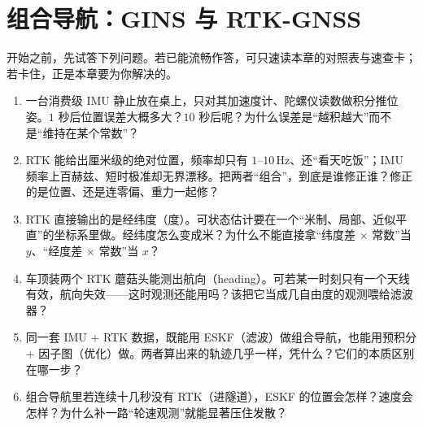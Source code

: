 \chapter{组合导航：GINS 与 RTK-GNSS}
\label{ch:gins}

\begin{practice}[前置自测]
开始之前，先试答下列问题。若已能流畅作答，可只速读本章的对照表与速查卡；若卡住，正是本章要为你解决的。
\begin{enumerate}
  \item 一台消费级 IMU 静止放在桌上，只对其加速度计、陀螺仪读数做积分推位姿。$1$ 秒后位置误差大概多大？$10$ 秒后呢？为什么误差是“越积越大”而不是“维持在某个常数”？
  \item RTK 能给出厘米级的绝对位置，频率却只有 $1$–$10$\,Hz、还“看天吃饭”；IMU 频率上百赫兹、短时极准却无界漂移。把两者“组合”，到底是谁修正谁？修正的是位置、还是连零偏、重力一起修？
  \item RTK 直接输出的是经纬度（度）。可状态估计要在一个“米制、局部、近似平直”的坐标系里做。经纬度怎么变成米？为什么不能直接拿“纬度差 $\times$ 常数”当 $y$、“经度差 $\times$ 常数”当 $x$？
  \item 车顶装两个 RTK 蘑菇头能测出航向（heading）。可若某一时刻只有一个天线有效，航向失效——这时观测还能用吗？该把它当成几自由度的观测喂给滤波器？
  \item 同一套 IMU + RTK 数据，既能用 ESKF（滤波）做组合导航，也能用预积分 + 因子图（优化）做。两者算出来的轨迹几乎一样，凭什么？它们的本质区别在哪一步？
  \item 组合导航里若连续十几秒没有 RTK（进隧道），ESKF 的位置会怎样？速度会怎样？为什么补一路“轮速观测”就能显著压住发散？
\end{enumerate}
\end{practice}

